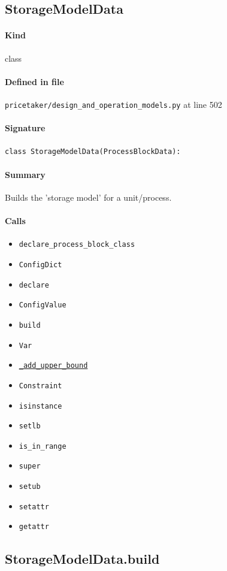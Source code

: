 \documentclass[11pt]{report}
\begin{document}
\subsection{StorageModelData}
\label{def:pricetaker-design_and_operation_models.py:StorageModelData:L502}
\paragraph{Kind} class
\paragraph{Defined in file} \texttt{pricetaker/design\_and\_operation\_models.py} at line 502
\paragraph{Signature} \texttt{class StorageModelData(ProcessBlockData):}
\paragraph{Summary} Builds the 'storage model' for a unit/process.
\paragraph{Calls}
\begin{itemize}[leftmargin=*]
  \item \texttt{declare\_process\_block\_class}
  \item \texttt{ConfigDict}
  \item \texttt{declare}
  \item \texttt{ConfigValue}
  \item \texttt{build}
  \item \texttt{Var}
  \item \hyperref[def:pricetaker-design_and_operation_models.py:StorageModelData.build._add_upper_bound:L575]{\texttt{\_add\_upper\_bound}}
  \item \texttt{Constraint}
  \item \texttt{isinstance}
  \item \texttt{setlb}
  \item \texttt{is\_in\_range}
  \item \texttt{super}
  \item \texttt{setub}
  \item \texttt{setattr}
  \item \texttt{getattr}
\end{itemize}
\subsection{StorageModelData.build}
\label{def:pricetaker-design_and_operation_models.py:StorageModelData.build:L562}
\end{document}
